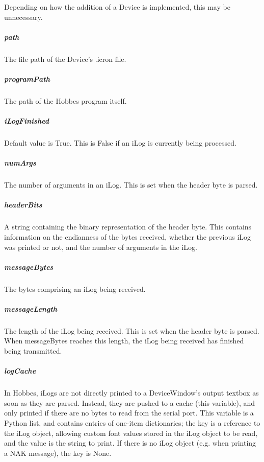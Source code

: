 \documentclass[12pt,letterpaper]{article}
\begin{document}
Depending on how the addition of a Device is implemented, this may be unnecessary.



%
%
\subparagraph{path}
\label{4.3.2.2.16}

The file path of the Device's .icron file.



%
%
\subparagraph{programPath}
\label{4.3.2.2.17}

The path of the Hobbes program itself.



%
%
\subparagraph{iLogFinished}
\label{4.3.2.2.18}

Default value is True. This is False if an iLog is currently being processed.



%
%
\subparagraph{numArgs}
\label{4.3.2.2.19}

The number of arguments in an iLog. This is set when the header byte is parsed.



%
%
\subparagraph{headerBits}
\label{4.3.2.2.20}

A string containing the binary representation of the header byte. This contains information on the endianness of the bytes received, whether the previous iLog was printed or not, and the number of arguments in the iLog.



%
%
\subparagraph{messageBytes}
\label{4.3.2.2.21}

The bytes comprising an iLog being received.



%
%
\subparagraph{messageLength}
\label{4.3.2.2.22}

The length of the iLog being received. This is set when the header byte is parsed. When messageBytes reaches this length, the iLog being received has finished being transmitted.



%
%
\subparagraph{logCache}
\label{4.3.2.2.23}

In Hobbes, iLogs are not directly printed to a DeviceWindow's output textbox as soon as they are parsed. Instead, they are pushed to a cache (this variable), and only printed if there are no bytes to read from the serial port. This variable is a Python list, and contains entries of one-item dictionaries; the key is a reference to the iLog object, allowing custom font values stored in the iLog object to be read, and the value is the string to print. If there is no iLog object (e.g. when printing a NAK message), the key is None.
\end{document}

